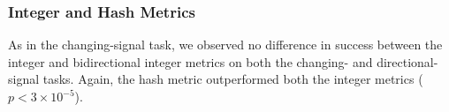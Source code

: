 \subsubsection{Integer and Hash Metrics}

As in the changing-signal task, we observed no difference in success between the integer and bidirectional integer metrics on both the changing- and directional-signal tasks.
Again, the hash metric outperformed both the integer metrics ($p < 3\times10^{-5}$).



